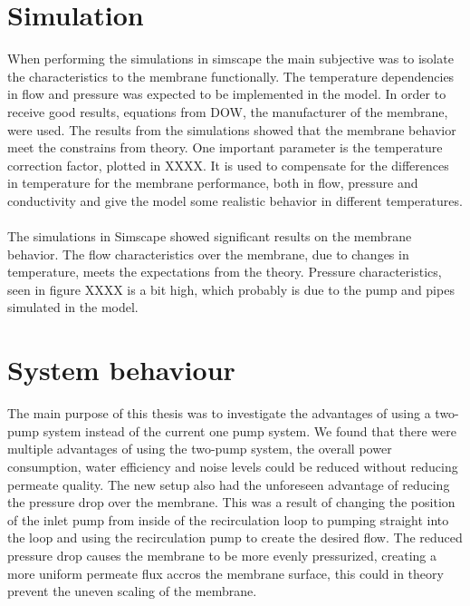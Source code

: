 \section{Simulation}
When performing the simulations in simscape the main subjective was to isolate the characteristics to the membrane functionally. The temperature dependencies in flow and pressure was expected to be implemented in the model. In order to receive good results, equations from DOW, the manufacturer of the membrane, were used. The results from the simulations showed that the membrane behavior meet the constrains from theory. One important parameter is the temperature correction factor, plotted in XXXX. It is used to compensate for the differences in temperature for the membrane performance, both in flow, pressure and conductivity and give the model some realistic behavior in different temperatures. \\
\\
The simulations in Simscape showed significant results on the membrane behavior. The flow characteristics over the membrane, due to changes in temperature, meets the expectations from the theory. Pressure characteristics, seen in figure XXXX is a bit high, which probably is due to the pump and pipes simulated in the model. 



\section{System behaviour} 


The main purpose of this thesis was to investigate the advantages of using a two-pump system instead of the current one pump system. We found that there were multiple advantages of using the two-pump system, the overall power consumption, water efficiency and noise levels could be reduced without reducing permeate quality. The new setup also had the unforeseen advantage of reducing the pressure drop over the membrane. This was a result of changing the position of the inlet pump from inside of the recirculation loop to pumping straight into the loop and using the recirculation pump to create the desired flow. The reduced pressure drop causes the membrane to be more evenly pressurized, creating a more uniform permeate flux accros the membrane surface, this could in theory prevent the uneven scaling of the membrane.

